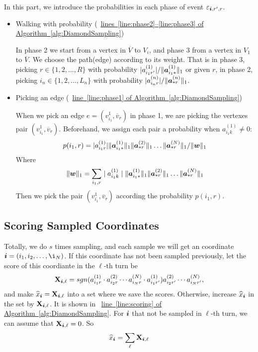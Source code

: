 \documentclass[letterpaper]{article}
\newcommand{\Sca}[3]{{#1}^{(#2)}_{i_#2#3}}%
\newcommand{\V}[1]{{\bm{{\MakeLowercase{#1}}}}}
\newcommand{\Varow}[1]{\V{a}^{(#1)}_{i_#1*}}
\newcommand{\Vacol}[1]{\V{a}^{(#1)}_{*r}}
\newcommand{\M}[1]{{\bm{\mathbf{\MakeUppercase{#1}}}}}
\newcommand{\norm}[2]{\|#1\|_{#2}}
\newcommand{\AlgLine}[2]{\hyperref[alg:#1]{line~\ref*{line:#2} of Algorithm~\ref*{alg:#1}}}
\newcommand{\AlgLines}[3]{\hyperref[alg:#1]{lines~\ref*{line:#2}--\ref*{line:#3} of Algorithm~\ref*{alg:#1}}}
\begin{document}
In this part, we introduce the probabilities in each phase of event $\varepsilon_{\V{i},r',r}$.

\begin{itemize}
  \item Walking with probability  (~\AlgLines{DiamondSampling}{phase2}{phase3})

  In phase 2 we start from a vertex in $\overline{V}$ to $V_i$, and phase 3 from a vertex in $V_1$ to $\overline{V}$. We choose the path(edge) according to its weight. That is in phase 3, picking $r\in\{1,2,\ldots,R\}$ with probability $|\Sca{a}{1}{r'}|/\norm{\Varow{1}}{1}$ or given $r$, in phase 2, picking $i_n\in\{1,2,\ldots,L_n\}$ with probability $|\Sca{a}{n}{r}|/\norm{\Vacol{n}}{1}$.

  \item Picking an edge (~\AlgLine{DiamondSampling}{phase1})

  When we pick an edge $e=(v^1_{i_1},\overline{v}_r)$ in phase 1, we are picking the vertexes pair $(v^1_{i_1},\overline{v}_r)$. Beforehand, we assign each pair a probability when $ \Sca{a}{1}{k} \neq 0 $:
  \[
    p(i_1,r) = |\Sca{a}{1}{r}|\norm{\Varow{1}}{1} \norm{\Vacol{2}}{1} \ldots \norm{\Vacol{N}}{1} / \norm{\V{W}}{1}
  \]
  Where
  \[
    \norm{\V{W}}{1} = \sum_{i_1,r}\mid \Sca{a}{1}{k}\mid \norm{\Varow{1}}{1} \norm{\Vacol{2}}{1} \ldots \norm{\Vacol{N}}{1}
  \]
  Then we pick the pair $(v^1_{i_1},\overline{v}_r)$ according the probability $p(i_1,r)$.
\end{itemize}

\subsection{Scoring Sampled Coordinates}

Totally, we do $s$ times sampling, and each sample we will get an coordinate $\V{i} = (i_1,i_2,\ldots,\i_N) $. If this coordinate has not been sampled previously, let the score of this coordiante in the $\ell $-th turn be
\[
\M{X}_{\V{i},\ell}  = sgn(\Sca{a}{1}{r}\cdot\Sca{a}{2}{r}\cdots\Sca{a}{N}{r}\cdot\Sca{a}{1}{r'}) \Sca{a}{2}{r'}\cdots\Sca{a}{N}{r'},
\]
and make $\widehat{x}_{\V{i}} = \M{X}_{\V{i},\ell}$ into a set where we save the scores. Otherwise, increase $\widehat{x}_{\V{i}}$ in the set by $\M{X}_{\V{i},\ell}$. It is shown in ~\AlgLine{DiamondSampling}{scoring}. For $\V{i}$ that not be sampled in $\ell$-th turn, we can assume that $\M{X}_{\V{i},\ell}=0$. So
\[
\widehat{x}_{\V{i}} = \sum_{\ell} \M{X}_{\V{i},\ell}
\]
\end{document}

